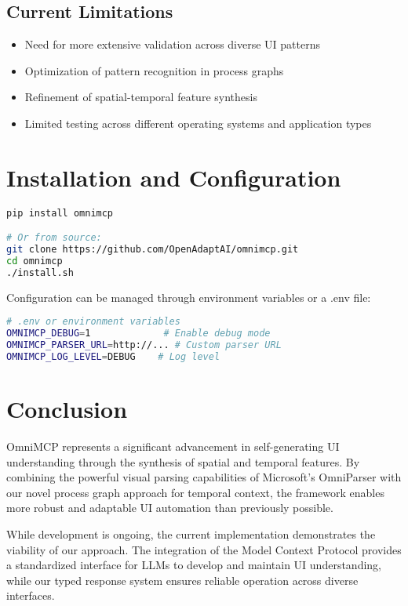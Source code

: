\documentclass{article}
\begin{document}
\subsection{Current Limitations}
\begin{itemize}
    \item Need for more extensive validation across diverse UI patterns
    \item Optimization of pattern recognition in process graphs
    \item Refinement of spatial-temporal feature synthesis
    \item Limited testing across different operating systems and application types
\end{itemize}

\section{Installation and Configuration}

\begin{lstlisting}[language=bash]
pip install omnimcp

# Or from source:
git clone https://github.com/OpenAdaptAI/omnimcp.git
cd omnimcp
./install.sh
\end{lstlisting}

Configuration can be managed through environment variables or a .env file:

\begin{lstlisting}[language=bash]
# .env or environment variables
OMNIMCP_DEBUG=1             # Enable debug mode
OMNIMCP_PARSER_URL=http://... # Custom parser URL
OMNIMCP_LOG_LEVEL=DEBUG    # Log level
\end{lstlisting}

\section{Conclusion}

OmniMCP represents a significant advancement in self-generating UI understanding through the synthesis of spatial and temporal features. By combining the powerful visual parsing capabilities of Microsoft's OmniParser with our novel process graph approach for temporal context, the framework enables more robust and adaptable UI automation than previously possible.

While development is ongoing, the current implementation demonstrates the viability of our approach. The integration of the Model Context Protocol provides a standardized interface for LLMs to develop and maintain UI understanding, while our typed response system ensures reliable operation across diverse interfaces.
\end{document}
